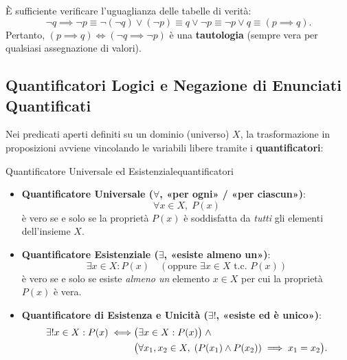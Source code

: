\begin{dimostrazione}
È sufficiente verificare l'uguaglianza delle tabelle di verità:
\begin{equation}
    \neg q \implies \neg p \equiv \neg(\neg q) \lor (\neg p) \equiv q \lor \neg p \equiv \neg p \lor q \equiv (p \implies q).
\end{equation}
Pertanto, $(p \implies q) \iff (\neg q \implies \neg p)$ è una \textbf{tautologia} (sempre vera per qualsiasi assegnazione di valori).
\end{dimostrazione}

\subsection{Quantificatori Logici e Negazione di Enunciati Quantificati}

Nei predicati aperti definiti su un dominio (universo) $X$, la trasformazione in proposizioni avviene vincolando le variabili libere tramite i \textbf{quantificatori}:

\begin{definizione}{Quantificatore Universale ed Esistenziale}{quantificatori}
\begin{itemize}
    \item \textbf{Quantificatore Universale ($\forall$, «per ogni» / «per ciascun»)}:
    \begin{equation}
        \forall x \in X, \; P(x)
    \end{equation}
    è vero se e solo se la proprietà $P(x)$ è soddisfatta da \emph{tutti} gli elementi dell'insieme $X$.
    \item \textbf{Quantificatore Esistenziale ($\exists$, «esiste almeno un»)}:
    \begin{equation}
        \exists x \in X : P(x) \quad (\text{oppure } \exists x \in X \text{ t.c. } P(x))
    \end{equation}
    è vero se e solo se esiste \emph{almeno un} elemento $x \in X$ per cui la proprietà $P(x)$ è vera.
    \item \textbf{Quantificatore di Esistenza e Unicità ($\exists!$, «esiste ed è unico»)}:
    \begin{align}
        \exists! x \in X : P(x) \iff &\big(\exists x \in X : P(x)\big) \;\land \notag \\
        &\big(\forall x_1, x_2 \in X, \; (P(x_1) \land P(x_2)) \implies x_1 = x_2\big).
    \end{align}
\end{itemize}
\end{definizione}

